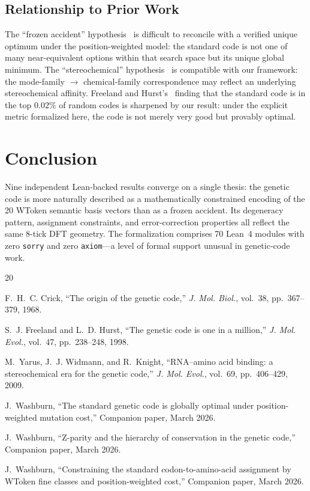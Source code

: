 \documentclass[11pt,twocolumn]{article}
\begin{document}
\subsection{Relationship to Prior Work}

The ``frozen accident'' hypothesis~\cite{Crick1968} is difficult to
reconcile with a verified unique optimum under the position-weighted model:
the standard code is not one of many near-equivalent options within that
search space but its unique global minimum.
The ``stereochemical'' hypothesis~\cite{Yarus2009} is compatible with our
framework: the mode-family $\to$ chemical-family correspondence may reflect
an underlying stereochemical affinity.
Freeland and Hurst's~\cite{Freeland1998} finding that the standard code is
in the top $0.02\%$ of random codes is sharpened by our result: under the
explicit metric formalized here, the code is not merely very good but
provably optimal.

\section{Conclusion}

Nine independent Lean-backed results converge on a single thesis: the
genetic code is more naturally described as a mathematically constrained
encoding of the 20 WToken semantic basis vectors than as a frozen accident.
Its degeneracy pattern, assignment constraints, and error-correction
properties all reflect the same 8-tick DFT geometry. The formalization
comprises 70 Lean~4 modules with zero \texttt{sorry} and zero
\texttt{axiom}---a level of formal support unusual in genetic-code work.

\begin{thebibliography}{20}

F.~H.~C. Crick,
``The origin of the genetic code,''
\emph{J. Mol. Biol.}, vol.~38, pp.~367--379, 1968.

S.~J. Freeland and L.~D. Hurst,
``The genetic code is one in a million,''
\emph{J. Mol. Evol.}, vol.~47, pp.~238--248, 1998.

M.~Yarus, J.~J. Widmann, and R.~Knight,
``RNA--amino acid binding: a stereochemical era for the genetic code,''
\emph{J. Mol. Evol.}, vol.~69, pp.~406--429, 2009.

J.~Washburn,
``The standard genetic code is globally optimal under position-weighted mutation cost,''
Companion paper, March 2026.

J.~Washburn,
``Z-parity and the hierarchy of conservation in the genetic code,''
Companion paper, March 2026.

J.~Washburn,
``Constraining the standard codon-to-amino-acid assignment by WToken fine classes and position-weighted cost,''
Companion paper, March 2026.

\end{thebibliography}
\end{document}
